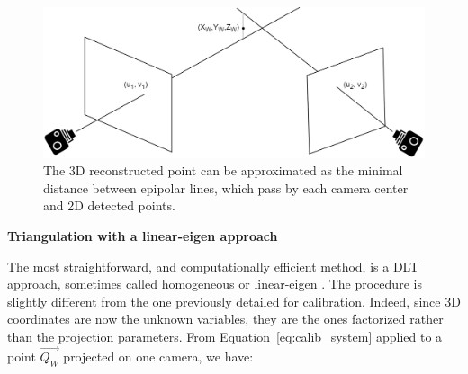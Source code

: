 \begin{figure}[hbtp]
	\centering
	\def\svgwidth{1\columnwidth}
	\fontsize{10pt}{10pt}\selectfont
	\includegraphics[width=0.7\linewidth]{"../Chap2/Figures/Triangulation.png"}
	\caption{The 3D reconstructed point can be approximated as the minimal distance between epipolar lines, which pass by each camera center and 2D detected points.}
	\label{fig_triangulation}
\end{figure}

\noindent\textbf{Triangulation with a linear-eigen approach}  

The most straightforward, and computationally efficient method, is a DLT approach, sometimes called homogeneous or linear-eigen \cite{Hartley1997}. The procedure is slightly different from the one previously detailed for calibration. Indeed, since 3D coordinates are now the unknown variables, they are the ones factorized rather than the projection parameters. From Equation~\ref{eq:calib_system} applied to a point $\overrightarrow{Q_W}$ projected on one camera, we have:

